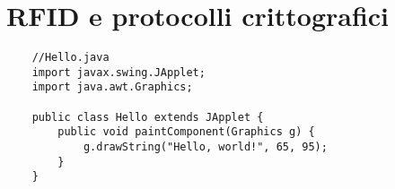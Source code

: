 \chapter{RFID e protocolli crittografici}

\begin{lstlisting}
	//Hello.java
	import javax.swing.JApplet;
	import java.awt.Graphics;
	
	public class Hello extends JApplet {
		public void paintComponent(Graphics g) {
			g.drawString("Hello, world!", 65, 95);
		}    
	}
\end{lstlisting}
